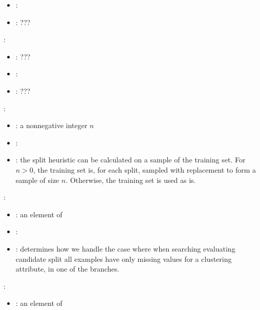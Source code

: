 \begin{itemize}
{\begin{itemize}
                \item \optionDefaultValue{}: \optionDefaultValueStyle{\{\}}
                \item \optionDescrption{}: ???
           \end{itemize}
    \item {}:
           \begin{itemize}
                \item \optionPossibleValues{}: ???
                \item \optionDefaultValue{}: 
                \item \optionDescrption{}: ???
           \end{itemize}
    }
    \item {}:
           \begin{itemize}
                \item \optionPossibleValues{}: a nonnegative integer $n$
                \item \optionDefaultValue{}: 
                \item \optionDescrption{}: the split heuristic can be calculated on a sample of the training set. For $n > 0$, the training set is, for each split, sampled with replacement to form a sample of size $n$. Otherwise, the training set is used as is. 
           \end{itemize}
    \item {}:
           \begin{itemize}
                \item \optionPossibleValues{}: an element of 
                \item \optionDefaultValue{}: 
                \item \optionDescrption{}: determines how we handle the case where when searching evaluating candidate split all examples have only missing values for a clustering attribute, in one of the branches.
           \end{itemize}
    \item {}:
           \begin{itemize}
                \item \optionPossibleValues{}: an element of 

\end{itemize}
\end{itemize}
